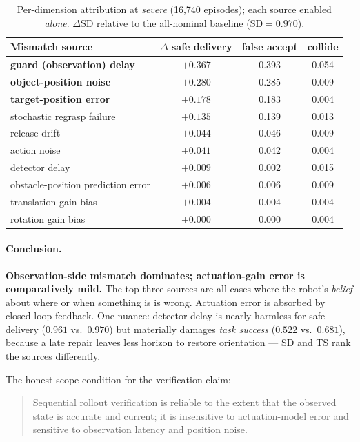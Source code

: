 \documentclass[11pt]{article}
\newcommand{\SD}{\mathrm{SD}}
\begin{document}
\begin{table}[htbp]\centering
\caption{Per-dimension attribution at \emph{severe} (16{,}740 episodes); each
source enabled \emph{alone}. $\Delta$SD relative to the all-nominal baseline
($\SD=0.970$).}
\begin{tabular}{lccc}
\toprule
Mismatch source & $\Delta$ safe delivery & false accept & collide \\
\midrule
\textbf{guard (observation) delay} & $\mathbf{+0.367}$ & 0.393 & 0.054 \\
\textbf{object-position noise}     & $\mathbf{+0.280}$ & 0.285 & 0.009 \\
\textbf{target-position error}     & $\mathbf{+0.178}$ & 0.183 & 0.004 \\
stochastic regrasp failure         & $+0.135$ & 0.139 & 0.013 \\
release drift                      & $+0.044$ & 0.046 & 0.009 \\
action noise                       & $+0.041$ & 0.042 & 0.004 \\
detector delay                     & $+0.009$ & 0.002 & 0.015 \\
obstacle-position prediction error & $+0.006$ & 0.006 & 0.009 \\
translation gain bias              & $+0.004$ & 0.004 & 0.004 \\
rotation gain bias                 & $+0.000$ & 0.000 & 0.004 \\
\bottomrule
\end{tabular}
\end{table}

\paragraph{Conclusion.} \textbf{Observation-side mismatch dominates;
actuation-gain error is comparatively mild.} The top three sources are all cases
where the robot's \emph{belief} about where or when something is is wrong.
Actuation error is absorbed by closed-loop feedback. One nuance: detector delay
is nearly harmless for safe delivery ($0.961$ vs.\ $0.970$) but materially
damages \emph{task success} ($0.522$ vs.\ $0.681$), because a late repair leaves
less horizon to restore orientation --- SD and TS rank the sources differently.

The honest scope condition for the verification claim:
\begin{quote}
Sequential rollout verification is reliable to the extent that the observed
state is accurate and current; it is insensitive to actuation-model error and
sensitive to observation latency and position noise.
\end{quote}
\end{document}
